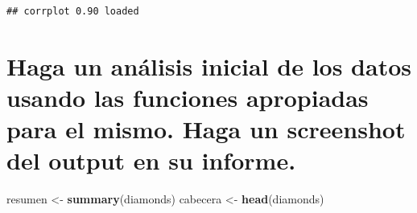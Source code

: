 \documentclass[
]{article}
\newenvironment{Shaded}{\begin{snugshade}}{\end{snugshade}}
\newcommand{\DataTypeTok}[1]{\textcolor[rgb]{0.13,0.29,0.53}{#1}}
\newcommand{\KeywordTok}[1]{\textcolor[rgb]{0.13,0.29,0.53}{\textbf{#1}}}
\newcommand{\NormalTok}[1]{#1}
\newcommand{\OperatorTok}[1]{\textcolor[rgb]{0.81,0.36,0.00}{\textbf{#1}}}
\newcommand{\StringTok}[1]{\textcolor[rgb]{0.31,0.60,0.02}{#1}}
\begin{document}
\begin{verbatim}
## corrplot 0.90 loaded
\end{verbatim}

\hypertarget{haga-un-anuxe1lisis-inicial-de-los-datos-usando-las-funciones-apropiadas-para-el-mismo.-haga-un-screenshot-del-output-en-su-informe.}{%
\section{Haga un análisis inicial de los datos usando las funciones
apropiadas para el mismo. Haga un screenshot del output en su
informe.}\label{haga-un-anuxe1lisis-inicial-de-los-datos-usando-las-funciones-apropiadas-para-el-mismo.-haga-un-screenshot-del-output-en-su-informe.}}

\begin{Shaded}
\begin{Highlighting}[]
\NormalTok{resumen <-}\StringTok{ }\KeywordTok{summary}\NormalTok{(diamonds)}
\NormalTok{cabecera <-}\StringTok{ }\KeywordTok{head}\NormalTok{(diamonds)}
\end{Highlighting}
\end{Shaded}

\begin{Shaded}
\end{Shaded}
\end{document}
